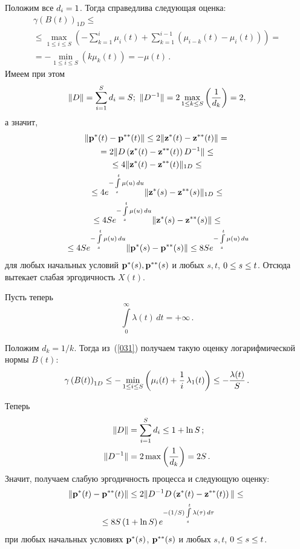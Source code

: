 {\begin{multicols}{2}
Положим все $d_i\hm=1$. Тогда справедлива следу\-ющая оценка:
\begin{multline*}
\gamma \left(B(t)\right)_{1D} \le {}\\
{}\le
\max_{1 \le i \le S} \left(-
\sum\limits_{k=1}^{i} \mu_{i}(t) +
\sum\limits_{k=1}^{i-1}(\mu_{i-k}(t)-\mu_i(t)) \right) = {}\\
{}= -\min\limits_{1 \le i \le S} \left( k\mu_k(t)\right) = -  \mu (t)\,.
\end{multline*}
Имеем  при этом
$$
\|D\|=\sum\limits_{i=1}^S d_i=S;\
 \|D^{-1}\|=2\max\limits_{1\le k \le S}\left(\displaystyle\frac{\displaystyle 1\mathstrut}{\displaystyle d_k\mathstrut}\right)=2,
 $$
 а значит,
\begin{multline*}
\|\mathbf{p}^*(t)-\mathbf{p}^{**}(t)\| \le
2\|{\mathbf z}^*(t)-{\mathbf z}^{**}(t)\| ={}\\
{}=  2\|D \left({\mathbf z}^*(t)-{\mathbf z}^{**}(t)\right) D^{-1}\| \le  {}\\
{}\le 4 \|{\mathbf z}^*(t)-{\mathbf z}^{**}(t)\|_{1D}
 \le{}\\
 {}\le 4e^{-\int\limits_s^t {\mu(u)\,du}}\|{\mathbf z}^*(s)-{\mathbf z}^{**}(s)\|_{1D} \le{}\\
 {}\le 4S e^{-\int\limits_s^t {\mu(u)\,du}}\|{\mathbf z}^*(s)-{\mathbf z}^{**}(s)\| \le{} \\
{}\le 4Se^{-\int\limits_s^t {\mu(u)\,du}}\|\mathbf {p}^*(s)-\mathbf {p}^{**}(s)\| \le
8Se^{-\int\limits_s^t {\mu(u)\,du}}
\end{multline*}
для любых начальных условий ${\bf p^*}(s), {\bf p^{**}}(s)$ и
любых $s,t$, $0\hm\le s\hm\le t$. Отсюда вытекает слабая эргодичность $X(t)$.

\medskip

Пусть теперь
\begin{equation}
\int\limits_0^\infty  \lambda(t)\, dt = + \infty\,.
\label{040}
\end{equation}

Положим $d_k={1}/{k}$. Тогда из~(\ref{031})  получаем такую
оценку логарифмической нормы  $B(t)$:
\begin{equation*}
\gamma \left(B(t)\right)_{1D} \le -
\min\limits_{1 \le i \le S} \left( \mu_i(t) + \displaystyle\frac{\displaystyle 1\mathstrut}{\displaystyle i\mathstrut}\,\lambda_1(t)\right)
\le -\displaystyle\frac{\displaystyle \lambda(t)\mathstrut}{\displaystyle S\mathstrut}\,.
\end{equation*}

Теперь
\begin{align*}
\|D\| &= \sum\limits_{i=1}^S d_i \le 1 + \ln S\,;\\
\|D^{-1}\| &= 2\max \left( \displaystyle\frac{\displaystyle 1\mathstrut}{\displaystyle d_k\mathstrut}\right) = 2S\,.
\end{align*}
Значит, получаем слабую эргодичность процесса и следующую оценку:
\begin{multline*}
\|{\bf p^*}(t) - {\bf p^{**}}(t)\| \le  2\|D^{-1}D\left({\bf z^*}(t) - {\bf z^{**}}(t)\right)\| \le {} \\
{}\le  8S\left(1+\ln S\right)  e^{-(1/S)\int\limits_s^t\lambda
(\tau)\,d\tau}
\end{multline*}
при любых начальных условиях ${\bf p^*}(s)$, ${\bf p^{**}}(s)$ и
любых $s,t$, $0 \hm\le s \hm\le t$.


\end{multicols}}

